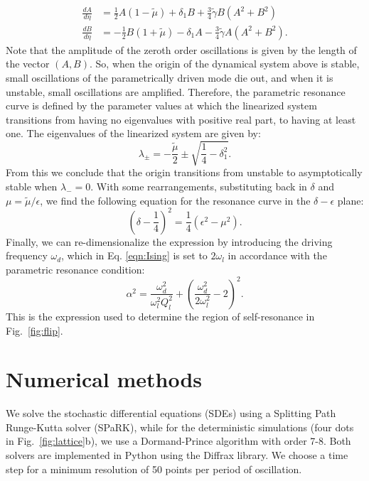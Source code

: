 \begin{align*}
\frac{dA}{d\eta} &= \frac{1}{2}A\left(1 -\tilde{\mu}\right) + \delta_1B + \frac{3}{4}\tilde{\gamma} B\left(A^2 + B^2\right)\\ 
\frac{dB}{d\eta} &= -\frac{1}{2}B\left(1 +\tilde{\mu}\right) - \delta_1A - \frac{3}{4}\tilde{\gamma} A\left(A^2 + B^2\right). 
\end{align*}
Note that the amplitude of the zeroth order oscillations is given by the length of the vector $(A, B)$. So, when the origin of the dynamical system above is stable, small oscillations of the parametrically driven mode die out, and when it is unstable, small oscillations are amplified. Therefore, the parametric resonance curve is defined by the parameter values at which the linearized system transitions from having no eigenvalues with positive real part, to having at least one. The eigenvalues of the linearized system are given by:
\[\lambda_\pm = -\frac{\tilde{\mu}}{2} \pm \sqrt{\frac{1}{4}-\delta_1^2}.\]
From this we conclude that the origin transitions from unstable to asymptotically stable when $\lambda_- = 0$. With some rearrangements, substituting back in $\delta$ and $\mu = \tilde{\mu}/\epsilon$, we find the following equation for the resonance curve in the $\delta-\epsilon$ plane:
\begin{equation*}
\left(\delta - \frac{1}{4}\right)^2= \frac{1}{4}(\epsilon^2 - \mu^2).
\end{equation*}
Finally, we can re-dimensionalize the expression by introducing the driving frequency $\omega_d$, which in Eq. \ref{eqn:Ising} is set to $2\omega_l$ in accordance with the parametric resonance condition: 
\begin{equation*}
\alpha^2 = \frac{\omega_d^2}{\omega_l^2Q_l^2} + \left(\frac{\omega_d^2}{2\omega_l^2} - 2\right)^2. \label{stability_curve_phys}   
\end{equation*}
This is the expression used to determine the region of self-resonance in Fig.~\ref{fig:flip}.

\section{Numerical methods}\label{Appendix:NumMeth}
We solve the stochastic differential equations (SDEs) using a Splitting Path Runge-Kutta solver (SPaRK), while for the deterministic simulations (four dots in Fig.~\ref{fig:lattice}b), we use a Dormand-Prince algorithm with order 7-8. Both solvers are implemented in Python using the Diffrax library. We choose a time step for a minimum resolution of 50 points per period of oscillation.

